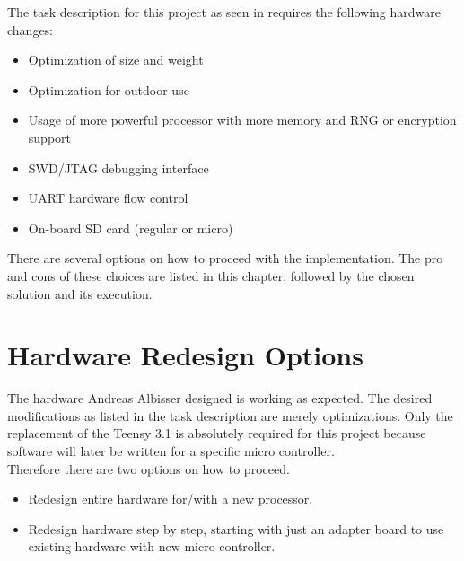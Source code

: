 %
The task description for this project as seen in  requires the following hardware changes:
%
\begin{itemize}%
    \item Optimization of size and weight %
    \item Optimization for outdoor use%
    \item Usage of more powerful processor with more memory and RNG or encryption support %
    \item SWD/JTAG debugging interface%
    \item UART hardware flow control
    \item On-board SD card (regular or micro)
\end{itemize}%
%
There are several options on how to proceed with the implementation. The pro and cons of these choices are listed in this chapter, followed by the chosen solution and its execution.
%
%
%
\section{Hardware Redesign Options}
The hardware Andreas Albisser designed is working as expected. The desired modifications as listed in the task description are merely optimizations. Only the replacement of the Teensy 3.1 is absolutely required for this project because software will later be written for a specific micro controller. \\
Therefore there are two options on how to proceed.\\
%
\begin{itemize}
    \item Redesign entire hardware for/with a new processor.
    \item Redesign hardware step by step, starting with just an adapter board to use existing hardware with new micro controller.
\end{itemize}
%
